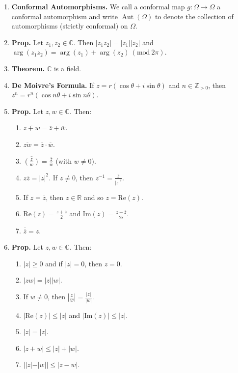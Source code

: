 \documentclass[12pt]{article}
\theoremstyle{definition}
\theoremstyle{named}
\DeclareMathOperator{\Aut}{Aut}
\newcommand{\Mod}[1]{\ (\mathrm{mod}\ #1)}
\begin{document}
{\begin{multicols}{2}
\begin{spacing}{1.01}
\begin{enumerate}
    \item \textbf{Conformal Automorphisms. } We call a conformal map $g: \Omega \to \Omega$ a conformal automorphism and write $\Aut(\Omega)$ to denote the collection of automorphisms (strictly conformal) on $\Omega$. 
    \item \textbf{Prop. } Let $z_1,z_2 \in \mathbb{C}$. Then $|z_1z_2| = |z_1||z_2|$ and $\arg(z_1z_2) = \arg(z_1) + \arg(z_2) \Mod{2\pi}$. 
    \item \textbf{Theorem. } $\mathbb{C}$ is a field. 
    \item \textbf{De Moivre's Formula. } If $z = r(\cos\theta + i\sin\theta)$ and $n \in \mathbb{Z}_{>0}$, then $z^n = r^n(\cos n\theta + i\sin n\theta)$. 
    \item \textbf{Prop. } Let $z,w \in \mathbb{C}$. Then: 
    \begin{enumerate}
        \item $\overline{z+w} = \overline{z} + \overline{w}$. 
        \item $\overline{zw} = \overline{z} \cdot \overline{w}$. 
        \item $\overline{\left(\frac{z}{w}\right)} = \frac{\overline{z}}{\overline{w}}$ (with $w \neq 0$). 
        \item $z\overline{z} = |z|^2$. If $z \neq 0$, then $z^{-1} = \frac{\overline{z}}{|z|^2}$. 
        \item If $z = \overline{z}$, then $z \in \mathbb{R}$ and so $z = \textrm{Re}(z)$. 
        \item $\textrm{Re}(z) = \frac{z+\overline{z}}{2}$ and $\textrm{Im}(z) = \frac{z-\overline{z}}{2i}$. 
        \item $\overline{\overline{z}} = z$. 
    \end{enumerate}
    \item \textbf{Prop. } Let $z,w \in \mathbb{C}$. Then: 
    \begin{enumerate}
        \item $|z| \geq 0$ and if $|z| = 0$, then $z=0$. 
        \item $|zw| = |z||w|$. 
        \item If $w \neq 0$, then $\left|\frac{z}{w}\right| = \frac{|z|}{|w|}$. 
        \item $|\textrm{Re}(z)| \leq |z|$ and $|\textrm{Im}(z)| \leq |z|$. 
        \item $|\overline{z}| = |z|$. 
        \item $|z+w| \leq |z| + |w|$. 
        \item $||z| - |w|| \leq |z-w|$. 

\end{enumerate}
\end{enumerate}
\end{spacing}
\end{multicols}}
\end{document}
